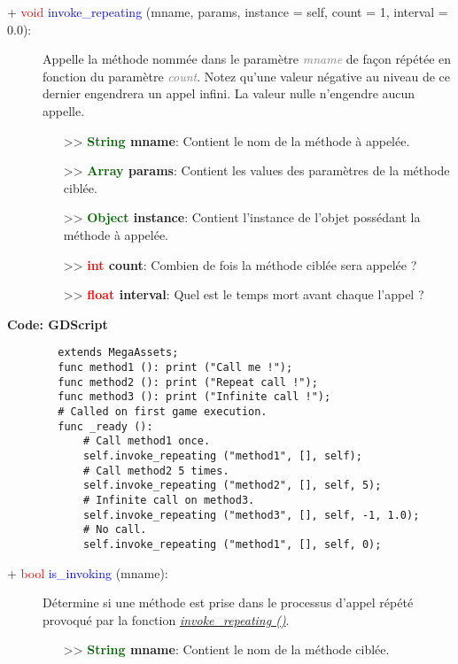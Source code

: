 \documentclass[a4paper, 11pt]{article}
\begin{document}
	\begin{description}
		\item [+ \textcolor{red}{void} \textcolor{blue}{\hypertarget{invokerepeating}{invoke\_repeating}} 
		(mname, params, instance = self, count = 1, interval = 0.0):] Appelle la méthode nommée dans le 
		paramètre \textit{\textcolor{gray}{mname}} de façon répétée en fonction du paramètre 
		\textit{\textcolor{gray}{count}}. Notez qu'une valeur négative au niveau de ce dernier engendrera un 
		appel infini. La valeur nulle n'engendre aucun appelle.
		\begin{itemize}
			\item [>> \textbf{\textcolor{darkgreen}{String} mname}:] Contient le nom de la méthode à 
			appelée.
			\item [>> \textbf{\textcolor{darkgreen}{Array} params}:] Contient les values des paramètres de 
			la méthode ciblée.
			\item [>> \textbf{\textcolor{darkgreen}{Object} instance}:] Contient l'instance de l'objet 
			possédant la méthode à appelée.
			\item [>> \textbf{\textcolor{red}{int} count}:] Combien de fois la méthode ciblée sera appelée ?
			\item [>> \textbf{\textcolor{red}{float} interval}:] Quel est le temps mort avant chaque l'appel 
			?\\
		\end{itemize}
	\end{description}
	\textbf{Code: GDScript}
	\begin{lstlisting}
		extends MegaAssets;
		func method1 (): print ("Call me !");
		func method2 (): print ("Repeat call !");
		func method3 (): print ("Infinite call !");
		# Called on first game execution.
		func _ready ():
			# Call method1 once.
			self.invoke_repeating ("method1", [], self);
			# Call method2 5 times.
			self.invoke_repeating ("method2", [], self, 5);
			# Infinite call on method3.
			self.invoke_repeating ("method3", [], self, -1, 1.0);
			# No call.
			self.invoke_repeating ("method1", [], self, 0);
	\end{lstlisting}
	\begin{description}
		\item [+ \textcolor{red}{bool} \textcolor{blue}{is\_invoking} (mname):] Détermine si une méthode est 
		prise dans le processus d'appel répété provoqué par la fonction \textit{\textcolor{blue}
		{\textit{\hyperlink{invokerepeating}{invoke\_repeating ()}}}}.
		\begin{itemize}
			\item [>> \textbf{\textcolor{darkgreen}{String} mname}:] Contient le nom de la méthode ciblée.\\
		\end{itemize}
	\end{description}
\end{document}
